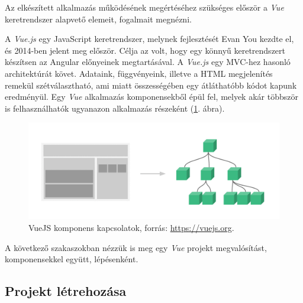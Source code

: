 
Az elkészített alkalmazás működésének megértéséhez szükséges először a \textit{Vue} keretrendszer alapvető elemeit, fogalmait megnézni.


A \textit{Vue.js} egy JavaScript keretrendszer, melynek fejlesztését Evan You kezdte el, és 2014-ben jelent meg először. Célja az volt, hogy egy könnyű keretrendszert készítsen az Angular előnyeinek megtartásával. A \textit{Vue.js} egy MVC-hez hasonló architektúrát követ. Adataink, függvényeink, illetve a HTML megjelenítés remekül szétválasztható, ami miatt összességében egy átláthatóbb kódot kapunk eredményül. Egy \textit{Vue} alkalmazás komponensekből épül fel, melyek akár többször is felhasználhatók ugyanazon alkalmazás részeként (\ref{fig:components}. ábra).

\begin{figure}[h!]
\centering
\includegraphics[scale=0.3]{images/components.png}
\caption{VueJS komponens kapcsolatok, forrás: \url{https://vuejs.org}.}
\label{fig:components}
\end{figure}

A következő szakaszokban nézzük is meg egy \textit{Vue} projekt megvalósítást, komponensekkel együtt, lépésenként.

\subsection{Projekt létrehozása}

